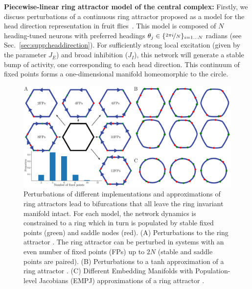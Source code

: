 \documentclass{article} %
\newcommand{\ptitle}[1]{\textbf{#1:}\xspace}
\newcounter{ct}
\theoremstyle{definition}
\theoremstyle{remark}
\begin{document}
\ptitle{Piecewise-linear ring attractor model of the central complex}
Firstly, we discuss perturbations of a continuous ring attractor proposed as a model for the head direction representation in fruit flies~\citep{Noorman2022}.
This model is composed of \(N\) heading-tuned neurons with preferred headings \(\theta_j \in \{\nicefrac{2\pi i}{N}\}_{i=1\dots N}\) radians (see Sec.~\ref{sec:supp:headdirection}).
For sufficiently strong local excitation (given by the parameter \(J_E\)) and broad inhibition (\(J_I\)), this network will generate a stable bump of activity, one corresponding to each head direction.
This continuum of fixed points forms a one-dimensional manifold homeomorphic to the circle.

\begin{figure}[tbhp]
     \centering
  \includegraphics[width=\textwidth]{bio_rings}
       \caption{ Perturbations of different implementations and approximations of ring attractors lead to bifurcations that all leave the ring invariant manifold intact. For each model, the network dynamics is constrained to a ring which in turn is populated by stable fixed points (green) and saddle nodes (red).
       (A) 	Perturbations to the ring attractor \citep{Noorman2022}. The ring attractor can be perturbed in systems with an even number of fixed points (FPs) up to \(2N\) (stable and saddle points are paired).
       (B) 	Perturbations to a tanh approximation of a ring attractor \citep{seeholzer2017efficient}.
       (C) 	Different Embedding Manifolds with Population-level Jacobians (EMPJ) approximations of a ring attractor \citep{pollock2020}.
       }\label{fig:bio_rings}
\end{figure}
\end{document}
